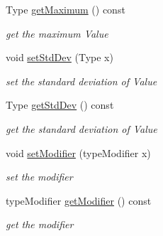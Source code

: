 \begin{DoxyCompactItemize}
Type \hyperlink{classParameter_a4bff89ddd1c3a3e8ebac73c907cb432e}{get\+Maximum} () const 
\begin{DoxyCompactList}\small\item\em get the maximum Value \end{DoxyCompactList}\item 
void \hyperlink{classParameter_a85ecc82055bbb4e7724d82ccff6bf3b6}{set\+Std\+Dev} (Type x)
\begin{DoxyCompactList}\small\item\em set the standard deviation of Value \end{DoxyCompactList}\item 
Type \hyperlink{classParameter_a01d2bff5f7ad0d99a3bf3a907421ffee}{get\+Std\+Dev} () const 
\begin{DoxyCompactList}\small\item\em get the standard deviation of Value \end{DoxyCompactList}\item 
void \hyperlink{classParameter_a4030a197e21b6f2a968047b6da958138}{set\+Modifier} (type\+Modifier x)
\begin{DoxyCompactList}\small\item\em set the modifier \end{DoxyCompactList}\item 
type\+Modifier \hyperlink{classParameter_aa6f79e36bd16f49c33302181fe5131d8}{get\+Modifier} () const 
\begin{DoxyCompactList}\small\item\em get the modifier \end{DoxyCompactList}\end{DoxyCompactItemize}

